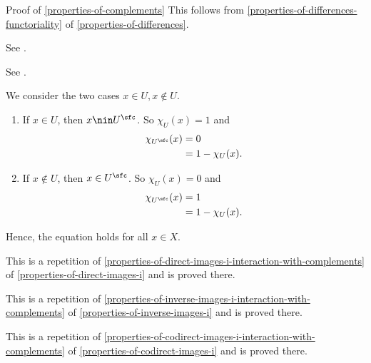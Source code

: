 \begin{Proof}{Proof of \cref{properties-of-complements}}%
    This follows from \cref{properties-of-differences-functoriality} of \cref{properties-of-differences}.

    See \cite{proof-wiki:de-morgan-s-laws-set-theory}.

    See \cite{proof-wiki:complement-of-complement}.

    We consider the two cases $x \in U, x \nin U$.
    \begin{enumerate}
        \item If $x \in U$, then $x \nin U^{\sfc}$. So $\chi_{U}(x) = 1$ and
          \begin{align*}
              \chi_{U^{\sfc}}(x) &= 0\\
                             &= 1-\chi_{U}(x).%
          \end{align*}
      \item If $x \nin U$, then $x \in U^{\sfc}$. So $\chi_{U}(x) = 0$ and
          \begin{align*}
              \chi_{U^{\sfc}}(x) &= 1\\
                             &= 1-\chi_{U}(x).%
          \end{align*}
    \end{enumerate}
    Hence, the equation holds for all $x \in X$.

    This is a repetition of \cref{properties-of-direct-images-i-interaction-with-complements} of \cref{properties-of-direct-images-i} and is proved there.

    This is a repetition of \cref{properties-of-inverse-images-i-interaction-with-complements} of \cref{properties-of-inverse-images-i} and is proved there.

    This is a repetition of \cref{properties-of-codirect-images-i-interaction-with-complements} of \cref{properties-of-codirect-images-i} and is proved there.
\end{Proof}
